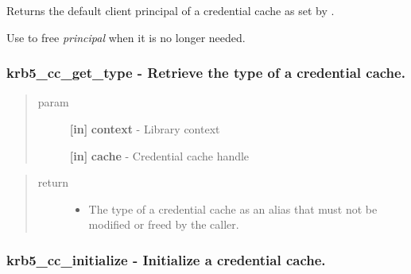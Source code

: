 \documentclass[letterpaper,10pt,english]{sphinxmanual}
\begin{document}
Returns the default client principal of a credential cache as set by {\hyperref[appdev/refs/api/krb5_cc_initialize:krb5_cc_initialize]{}} .

Use {\hyperref[appdev/refs/api/krb5_free_principal:krb5_free_principal]{}} to free \emph{principal} when it is no longer needed.


\subsubsection{krb5\_cc\_get\_type -  Retrieve the type of a credential cache.}
\label{appdev/refs/api/krb5_cc_get_type:krb5-cc-get-type-retrieve-the-type-of-a-credential-cache}\label{appdev/refs/api/krb5_cc_get_type::doc}

\begin{fulllineitems}
\label{appdev/refs/api/krb5_cc_get_type:krb5_cc_get_type}
\end{fulllineitems}

\begin{quote}\begin{description}
\item[{param}] \leavevmode
\textbf{{[}in{]}} \textbf{context} - Library context

\textbf{{[}in{]}} \textbf{cache} - Credential cache handle

\end{description}\end{quote}
\begin{quote}\begin{description}
\item[{return}] \leavevmode\begin{itemize}
\item {} 
The type of a credential cache as an alias that must not be modified or freed by the caller.

\end{itemize}

\end{description}\end{quote}


\subsubsection{krb5\_cc\_initialize -  Initialize a credential cache.}
\label{appdev/refs/api/krb5_cc_initialize::doc}\label{appdev/refs/api/krb5_cc_initialize:krb5-cc-initialize-initialize-a-credential-cache}
\end{document}
